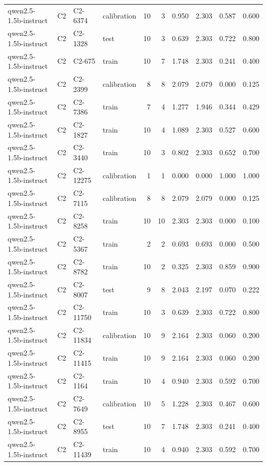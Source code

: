 \begin{table}
\begin{tabular}{llllrrrrrr}
qwen2.5-1.5b-instruct & C2 & C2-6374 & calibration & 10 & 3 & 0.950 & 2.303 & 0.587 & 0.600 \\
qwen2.5-1.5b-instruct & C2 & C2-1328 & test & 10 & 3 & 0.639 & 2.303 & 0.722 & 0.800 \\
qwen2.5-1.5b-instruct & C2 & C2-675 & train & 10 & 7 & 1.748 & 2.303 & 0.241 & 0.400 \\
qwen2.5-1.5b-instruct & C2 & C2-2399 & calibration & 8 & 8 & 2.079 & 2.079 & 0.000 & 0.125 \\
qwen2.5-1.5b-instruct & C2 & C2-7386 & train & 7 & 4 & 1.277 & 1.946 & 0.344 & 0.429 \\
qwen2.5-1.5b-instruct & C2 & C2-1827 & train & 10 & 4 & 1.089 & 2.303 & 0.527 & 0.600 \\
qwen2.5-1.5b-instruct & C2 & C2-3440 & train & 10 & 3 & 0.802 & 2.303 & 0.652 & 0.700 \\
qwen2.5-1.5b-instruct & C2 & C2-12275 & calibration & 1 & 1 & 0.000 & 0.000 & 1.000 & 1.000 \\
qwen2.5-1.5b-instruct & C2 & C2-7115 & calibration & 8 & 8 & 2.079 & 2.079 & 0.000 & 0.125 \\
qwen2.5-1.5b-instruct & C2 & C2-8258 & train & 10 & 10 & 2.303 & 2.303 & 0.000 & 0.100 \\
qwen2.5-1.5b-instruct & C2 & C2-5367 & train & 2 & 2 & 0.693 & 0.693 & 0.000 & 0.500 \\
qwen2.5-1.5b-instruct & C2 & C2-8782 & train & 10 & 2 & 0.325 & 2.303 & 0.859 & 0.900 \\
qwen2.5-1.5b-instruct & C2 & C2-8007 & test & 9 & 8 & 2.043 & 2.197 & 0.070 & 0.222 \\
qwen2.5-1.5b-instruct & C2 & C2-11750 & train & 10 & 3 & 0.639 & 2.303 & 0.722 & 0.800 \\
qwen2.5-1.5b-instruct & C2 & C2-11834 & calibration & 10 & 9 & 2.164 & 2.303 & 0.060 & 0.200 \\
qwen2.5-1.5b-instruct & C2 & C2-11415 & train & 10 & 9 & 2.164 & 2.303 & 0.060 & 0.200 \\
qwen2.5-1.5b-instruct & C2 & C2-1164 & train & 10 & 4 & 0.940 & 2.303 & 0.592 & 0.700 \\
qwen2.5-1.5b-instruct & C2 & C2-7649 & calibration & 10 & 5 & 1.228 & 2.303 & 0.467 & 0.600 \\
qwen2.5-1.5b-instruct & C2 & C2-8955 & test & 10 & 7 & 1.748 & 2.303 & 0.241 & 0.400 \\
qwen2.5-1.5b-instruct & C2 & C2-11439 & train & 10 & 4 & 0.940 & 2.303 & 0.592 & 0.700 \\

\end{tabular}
\end{table}
